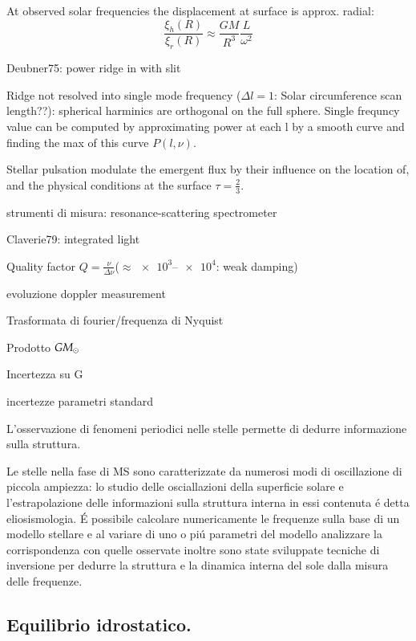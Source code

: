 \documentclass[../main.tex]{subfiles}
\begin{document}
\begin{itemize*}
\item At observed solar frequencies the displacement at surface is approx. radial:
\begin{equation*}
\frac{\xi_h(R)}{\xi_r(R)}\approx\frac{GM}{R^3}\frac{L}{\omega^2}
\end{equation*}

\item Deubner75: power ridge in \dgndi{} with slit
\item Ridge not resolved into single mode frequency ($\Delta l=1$: Solar circumference scan length??): spherical harminics are orthogonal on the full sphere. Single frequncy value can be computed by approximating power at each l by a smooth curve and finding the max of this curve $P(l,\nu)$.
\item Stellar pulsation modulate the emergent flux by their influence on the location of, and the physical conditions at the surface $\tau=\frac{2}{3}$.
\item strumenti di misura: resonance-scattering spectrometer
\item Claverie79: integrated light
\item Quality factor $Q=\frac{\nu}{\Delta\nu}$($\approx\numrange{e3}{e4}$: weak damping)
\item evoluzione doppler measurement
\item Trasformata di fourier/frequenza di Nyquist
\item Prodotto $GM_{\odot}$
\item Incertezza su G
\item incertezze parametri standard
\end{itemize*}


L'osservazione di fenomeni periodici nelle stelle permette di dedurre informazione sulla struttura.

Le stelle nella fase di MS  sono caratterizzate da numerosi modi di oscillazione di piccola ampiezza: lo studio delle osciallazioni della superficie solare e l'estrapolazione delle informazioni sulla struttura interna in essi contenuta \'e detta eliosismologia. \'E possibile calcolare numericamente le frequenze sulla base di un modello stellare e al variare di uno o pi\'u parametri del modello analizzare la corrispondenza con quelle osservate inoltre sono state sviluppate tecniche di inversione per dedurre la struttura e la dinamica interna del sole dalla misura delle frequenze.

\subsection{Equilibrio idrostatico.}
\end{document}
